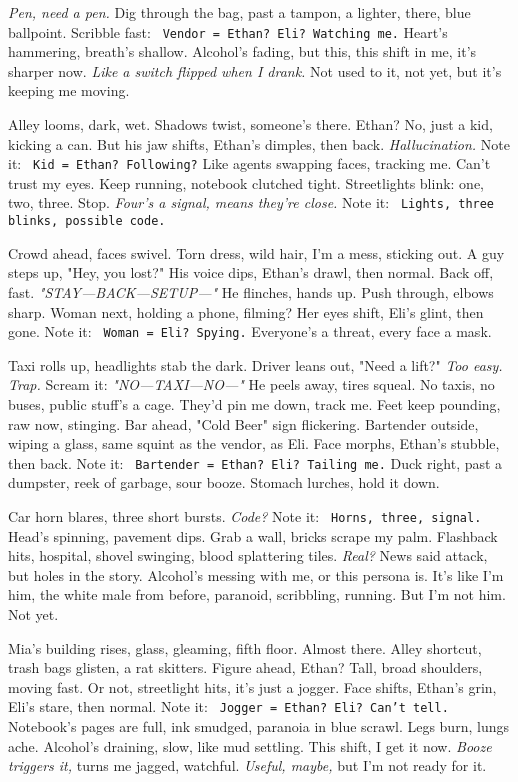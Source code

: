 \documentclass[12pt]{article} %
\newcommand{\note}[1]{\texttt{\small \color{DarkGray} #1}}
\begin{document}
\textit{Pen, need a pen.} Dig through the bag, past a tampon, a lighter, there, blue ballpoint. Scribble fast: \note{Vendor = Ethan? Eli? Watching me.} Heart’s hammering, breath’s shallow. Alcohol’s fading, but this, this shift in me, it’s sharper now. \textit{Like a switch flipped when I drank.} Not used to it, not yet, but it’s keeping me moving.

Alley looms, dark, wet. Shadows twist, someone’s there. \textnormal{Ethan}? No, just a kid, kicking a can. But his jaw shifts, \textnormal{Ethan}’s dimples, then back. \textit{Hallucination.} Note it: \note{Kid = Ethan? Following?} Like agents swapping faces, tracking me. Can’t trust my eyes. Keep running, notebook clutched tight. Streetlights blink: one, two, three. Stop. \textit{Four’s a signal, means they’re close.} Note it: \note{Lights, three blinks, possible code.}

Crowd ahead, faces swivel. Torn dress, wild hair, I’m a mess, sticking out. A guy steps up, "Hey, you lost?" His voice dips, \textnormal{Ethan}’s drawl, then normal. Back off, fast. \textit{"STAY—BACK—SETUP—"} He flinches, hands up. Push through, elbows sharp. Woman next, holding a phone, filming? Her eyes shift, \textnormal{Eli}’s glint, then gone. Note it: \note{Woman = Eli? Spying.} Everyone’s a threat, every face a mask.

Taxi rolls up, headlights stab the dark. Driver leans out, "Need a lift?" \textit{Too easy. Trap.} Scream it: \textit{"NO—TAXI—NO—"} He peels away, tires squeal. No taxis, no buses, public stuff’s a cage. They’d pin me down, track me. Feet keep pounding, raw now, stinging. Bar ahead, "Cold Beer" sign flickering. Bartender outside, wiping a glass, same squint as the vendor, as \textnormal{Eli}. Face morphs, \textnormal{Ethan}’s stubble, then back. Note it: \note{Bartender = Ethan? Eli? Tailing me.} Duck right, past a dumpster, reek of garbage, sour booze. Stomach lurches, hold it down.

Car horn blares, three short bursts. \textit{Code?} Note it: \note{Horns, three, signal.} Head’s spinning, pavement dips. Grab a wall, bricks scrape my palm. Flashback hits, hospital, shovel swinging, blood splattering tiles. \textit{Real?} News said attack, but holes in the story. Alcohol’s messing with me, or this persona is. It’s like I’m him, the white male from before, paranoid, scribbling, running. But I’m not him. Not yet.

\textnormal{Mia}’s building rises, glass, gleaming, fifth floor. Almost there. Alley shortcut, trash bags glisten, a rat skitters. Figure ahead, \textnormal{Ethan}? Tall, broad shoulders, moving fast. Or not, streetlight hits, it’s just a jogger. Face shifts, \textnormal{Ethan}’s grin, \textnormal{Eli}’s stare, then normal. Note it: \note{Jogger = Ethan? Eli? Can’t tell.} Notebook’s pages are full, ink smudged, paranoia in blue scrawl. Legs burn, lungs ache. Alcohol’s draining, slow, like mud settling. This shift, I get it now. \textit{Booze triggers it,} turns me jagged, watchful. \textit{Useful, maybe,} but I’m not ready for it.
\end{document}
